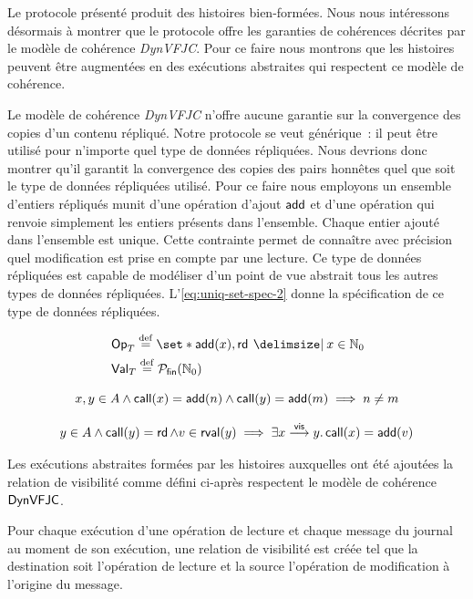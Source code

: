 Le protocole présenté produit des histoires bien-formées.
Nous nous intéressons désormais à montrer que le protocole offre les garanties de cohérences décrites par le modèle de cohérence \emph{DynVFJC}.
Pour ce faire nous montrons que les histoires peuvent être augmentées en des exécutions abstraites qui respectent ce modèle de cohérence.

Le modèle de cohérence \emph{DynVFJC} n'offre aucune garantie sur la convergence des copies d'un contenu répliqué.
Notre protocole se veut générique~: il peut être utilisé pour n'importe quel type de données répliquées.
Nous devrions donc montrer qu'il garantit la convergence des copies des pairs honnêtes quel que soit le type de données répliquées utilisé.
Pour ce faire nous employons un ensemble d'entiers répliqués munit d'une opération d'ajout $\operatorname{\mathsf{add}}$ et d'une opération qui renvoie simplement les entiers présents dans l'ensemble.
Chaque entier ajouté dans l'ensemble est unique.
Cette contrainte permet de connaître avec précision quel modification est prise en compte par une lecture.
Ce type de données répliquées est capable de modéliser d'un point de vue abstrait tous les autres types de données répliquées.
L'\autoref{eq:uniq-set-spec-2} donne la spécification de ce type de données répliquées.

\begin{align}
    &\trm{Op}_T \defeq \set*{\trm{add}(x), \trm{rd} \given x \in \mathbb{N}_0}\\
    &\trm{Val}_T \defeq \powerfset{\mathbb{N}_0}
\end{align}

\begin{equation}\label{eq:uniq-set-spec-1}
    x, y \in A \land \operatorname{\mathsf{call}}(x) = \operatorname{\mathsf{add}}(n) \land \operatorname{\mathsf{call}}(y) = \operatorname{\mathsf{add}}(m) \implies n \neq m
\end{equation}

\begin{equation}\label{eq:uniq-set-spec-2}
    y \in A \land \operatorname{\mathsf{call}}(y) = \operatorname{\mathsf{rd}} \land v \in \operatorname{\mathsf{rval}}(y) \implies \exists x \overset{\mathsf{vis}}{\longrightarrow} y \ldotp \operatorname{\mathsf{call}}(x) = \operatorname{\mathsf{add}}(v)
\end{equation}

Les exécutions abstraites formées par les histoires auxquelles ont été ajoutées la relation de visibilité comme défini ci-après respectent le modèle de cohérence $\operatorname{\mathsf{DynVFJC}}$.

Pour chaque exécution d'une opération de lecture et chaque message du journal au moment de son exécution, une relation de visibilité est créée tel que la destination soit l'opération de lecture et la source l'opération de modification à l'origine du message.

